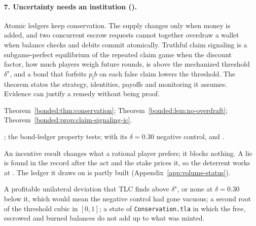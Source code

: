 \paragraph{7. Uncertainty needs an institution ().}
Atomic ledgers keep conservation. The supply changes only when money is added,
and two concurrent escrow requests cannot together overdraw a wallet when
balance checks and debits commit atomically. Truthful claim signaling is a
subgame-perfect equilibrium of the repeated claim game when the discount
factor, how much players weigh future rounds, is above the mechanized
threshold $\delta^{\star}$, and a bond that forfeits $p_{\mathrm f}b$ on each
false claim lowers the threshold. The theorem states the strategy, identities, payoffs and
monitoring it assumes. Evidence can justify a remedy without being proof.
\begin{description}[leftmargin=1.4em,itemsep=1pt]
  \item[Result] Theorem~\ref{bonded:thm:conservation};
  Theorem~\ref{bonded:lem:no-overdraft};
  Theorem~\ref{bonded:prop:claim-signaling-ic}.
  \item[Artifact] ; the
  bond-ledger property tests;  with
  its $\delta=0.30$ negative control, and
  .
  \item[Mode] An incentive result changes what a rational player prefers; it
  blocks nothing. A lie is found in the record after the act and the stake
  prices it, so the deterrent works at . The ledger it
  draws on is partly built (Appendix~\ref{app:volume-status}).
  \item[Falsifier] A profitable unilateral deviation that TLC finds above
  $\delta^{\star}$, or none at $\delta=0.30$ below it, which would mean the
  negative control had gone vacuous; a second root of the threshold cubic in
  $[0,1]$; a state of \texttt{Conservation.tla} in which the free, escrowed and
  burned balances do not add up to what was minted.
\end{description}

